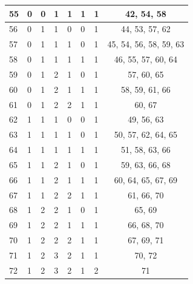 \begin{longtable}{|l|l|l|l|l|l|l|c|}
55 & 0 & 0 & 1 & 1 & 1 & 1 & 42, 54, 58 \\ \hline
56 & 0 & 1 & 1 & 0 & 0 & 1 & 44, 53, 57, 62 \\ \hline
57 & 0 & 1 & 1 & 1 & 0 & 1 & 45, 54, 56, 58, 59, 63 \\ \hline
58 & 0 & 1 & 1 & 1 & 1 & 1 & 46, 55, 57, 60, 64 \\ \hline
59 & 0 & 1 & 2 & 1 & 0 & 1 & 57, 60, 65 \\ \hline
60 & 0 & 1 & 2 & 1 & 1 & 1 & 58, 59, 61, 66 \\ \hline
61 & 0 & 1 & 2 & 2 & 1 & 1 & 60, 67 \\ \hline
62 & 1 & 1 & 1 & 0 & 0 & 1 & 49, 56, 63 \\ \hline
63 & 1 & 1 & 1 & 1 & 0 & 1 & 50, 57, 62, 64, 65 \\ \hline
64 & 1 & 1 & 1 & 1 & 1 & 1 & 51, 58, 63, 66 \\ \hline
65 & 1 & 1 & 2 & 1 & 0 & 1 & 59, 63, 66, 68 \\ \hline
66 & 1 & 1 & 2 & 1 & 1 & 1 & 60, 64, 65, 67, 69 \\ \hline
67 & 1 & 1 & 2 & 2 & 1 & 1 & 61, 66, 70 \\ \hline
68 & 1 & 2 & 2 & 1 & 0 & 1 & 65, 69 \\ \hline
69 & 1 & 2 & 2 & 1 & 1 & 1 & 66, 68, 70 \\ \hline
70 & 1 & 2 & 2 & 2 & 1 & 1 & 67, 69, 71 \\ \hline
71 & 1 & 2 & 3 & 2 & 1 & 1 & 70, 72 \\ \hline
72 & 1 & 2 & 3 & 2 & 1 & 2 & 71 \\ \hline
\end{longtable}


